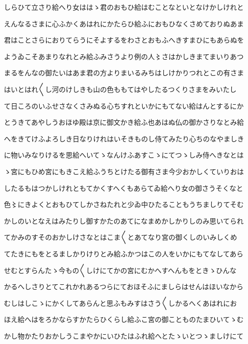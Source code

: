 \documentclass[a4paper,11pt,landscape]{ltjtarticle}
\begin{document}
\par\medskip
しらひて立さり給へり女ははゝ君のおもひ給はむことなといとなけかしけれと
\par\medskip
えんなるさまに心ふかくあはれにかたらひ給ふにおもひなくさめておりぬあま
\par\medskip
君はことさらにおりてらうにそよするをわさとおもふへきすまひにもあらぬを
\par\medskip
ようゐこそあまりなれとみ給ふみさうより例の人〻さはかしきまてまいりあつ
\par\medskip
まるをんなの御たいはあま君の方よりまいるみちはしけかりつれとこの有さま
\par\medskip
はいとはれ〱し河のけしきも山の色ももてはやしたるつくりさまをみいたし
\par\medskip
て日ころのいふせさなくさみぬる心ちすれといかにもてない給はんとするにか
\par\medskip
とうきてあやしうおほゆ殿は京に御文かき給ふ也あはぬ仏の御かさりなとみ給
\par\medskip
へをきてけふよろしき日なりけれはいそきものし侍てみたり心ちのなやましき
\par\medskip
に物いみなりけるを思給へいてゝなんけふあすこゝにてつゝしみ侍へきなとは
\par\medskip
ゝ宮にもひめ宮にもきこえ給ふうちとけたる御有さま今少おかしくていりおは
\par\medskip
したるもはつかしけれともてかくすへくもあらてゐ給へり女の御さうそくなと
\par\medskip
色〻にきよくとおもひてしかさねたれと少ゐ中ひたることもうちましりてそむ
\par\medskip
かしのいとなえはみたりし御すかたのあてになまめかしかりしのみ思いてられ
\par\medskip
てかみのすそのおかしけさなとはこま〱とあてなり宮の御くしのいみしくめ
\par\medskip
てたきにもをとるましかりけりとみ給ふかつはこの人をいかにもてなしてあら
\par\medskip
せむとすらんたゝ今もの〱しけにてかの宮にむかへすへんもをときゝひんな
\par\medskip
かるへしさりとてこれかれあるつらにておほそふにましらはせんはほいなから
\par\medskip
むしはしこゝにかくしてあらんと思ふもみすはさう〱しかるへくあはれにお
\par\medskip
ほえ給へはをろかならすかたらひくらし給ふこ宮の御ことものたまひいてゝむ
\par\medskip
かし物かたりおかしうこまやかにいひたはふれ給へとたゝいとつゝましけにて
\par\medskip
\end{document}
